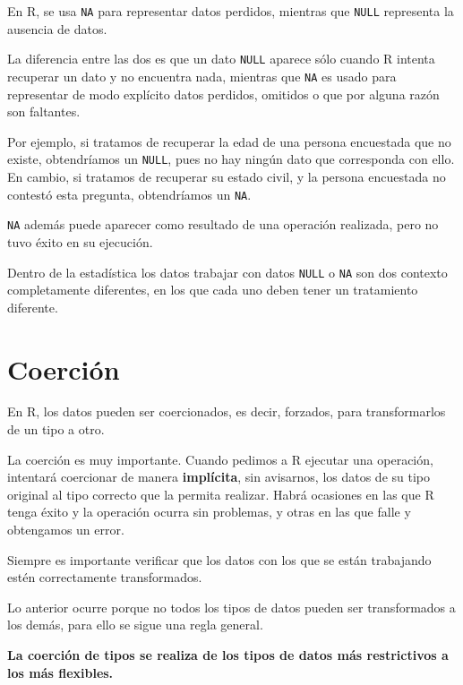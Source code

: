\documentclass[
]{book}
\makeatletter
\newenvironment{kframe}{%
\medskip{}
\setlength{\fboxsep}{.8em}
 \def\at@end@of@kframe{}%
 \ifinner\ifhmode%
  \def\at@end@of@kframe{\end{minipage}}%
  \begin{minipage}{\columnwidth}%
 \fi\fi%
 \def\FrameCommand##1{\hskip\@totalleftmargin \hskip-\fboxsep
 \colorbox{shadecolor}{##1}\hskip-\fboxsep
     \hskip-\linewidth \hskip-\@totalleftmargin \hskip\columnwidth}%
 \MakeFramed {\advance\hsize-\width
   \@totalleftmargin\z@ \linewidth\hsize
   \@setminipage}}%
 {\par\unskip\endMakeFramed%
 \at@end@of@kframe}
\newenvironment{rmdblock}[1]
  {
  \begin{itemize}
  \renewcommand{\labelitemi}{
    \raisebox{-.7\height}[0pt][0pt]{
      {\setkeys{Gin}{width=3em,keepaspectratio}\texttt{[image: images/\#1]}}
    }
  }
  \setlength{\fboxsep}{1em}
  \begin{kframe}
  \item
  }
  {
  \end{kframe}
  \end{itemize}
  }
\newenvironment{rmdwarning}
  {\begin{rmdblock}{warning}}
  {\end{rmdblock}}
\makeatother
\begin{document}
En R, se usa \texttt{NA} para representar datos perdidos, mientras que \texttt{NULL} representa la ausencia de datos.

La diferencia entre las dos es que un dato \texttt{NULL} aparece sólo cuando R intenta recuperar un dato y no encuentra nada, mientras que \texttt{NA} es usado para representar de modo explícito datos perdidos, omitidos o que por alguna razón son faltantes.

Por ejemplo, si tratamos de recuperar la edad de una persona encuestada que no existe, obtendríamos un \texttt{NULL}, pues no hay ningún dato que corresponda con ello. En cambio, si tratamos de recuperar su estado civil, y la persona encuestada no contestó esta pregunta, obtendríamos un \texttt{NA}.

\texttt{NA} además puede aparecer como resultado de una operación realizada, pero no tuvo éxito en su ejecución.

\begin{rmdwarning}
Dentro de la estadística los datos trabajar con datos \texttt{NULL} o \texttt{NA} son dos contexto completamente diferentes, en los que cada uno deben tener un tratamiento diferente.
\end{rmdwarning}

\hypertarget{coerciuxf3n}{%
\section{Coerción}\label{coerciuxf3n}}

En R, los datos pueden ser coercionados, es decir, forzados, para transformarlos de un tipo a otro.

La coerción es muy importante. Cuando pedimos a R ejecutar una operación, intentará coercionar de manera \textbf{implícita}, sin avisarnos, los datos de su tipo original al tipo correcto que la permita realizar. Habrá ocasiones en las que R tenga éxito y la operación ocurra sin problemas, y otras en las que falle y obtengamos un error.

\begin{rmdwarning}
Siempre es importante verificar que los datos con los que se están trabajando estén correctamente transformados.
\end{rmdwarning}

Lo anterior ocurre porque no todos los tipos de datos pueden ser transformados a los demás, para ello se sigue una regla general.

\textbf{La coerción de tipos se realiza de los tipos de datos más restrictivos a los más flexibles.}
\end{document}

